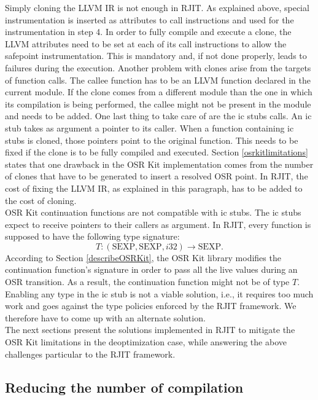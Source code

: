 Simply cloning the LLVM IR is not enough in RJIT.
As explained above, special instrumentation is inserted as attributes to call instructions and used for the instrumentation in step 4.
In order to fully compile and execute a clone, the LLVM attributes need to be set at each of its call instructions to allow the safepoint instrumentation.
This is mandatory and, if not done properly, leads to failures during the execution.
Another problem with clones arise from the targets of function calls. 
The callee function has to be an LLVM function declared in the current module. 
If the clone comes from a different module than the one in which its compilation is being performed, the callee might not be present in the module and needs to be added. 
One last thing to take care of are the ic stubs calls.
An ic stub takes as argument a pointer to its caller.
When a function containing ic stubs is cloned, those pointers point to the original function.
This needs to be fixed if the clone is to be fully compiled and executed.
Section \ref{osrkitlimitations} states that one drawback in the OSR Kit implementation comes from the number of clones that have to be generated to insert a resolved OSR point.
In RJIT, the cost of fixing the LLVM IR, as explained in this paragraph, has to be added to the cost of cloning.\\

OSR Kit continuation functions are not compatible with ic stubs.
The ic stubs expect to receive pointers to their callers as argument.
In RJIT, every function is supposed to have the following type signature:
$$T: (\text{SEXP}, \text{SEXP}, i32) \rightarrow \text{SEXP}.$$
According to Section \ref{describeOSRKit}, the OSR Kit\cite{OSRKit} library modifies the continuation function's signature in order to pass all the live values during an OSR transition.
As a result, the continuation function might not be of type $T$.
Enabling any type in the ic stub is not a viable solution, i.e., it requires too much work and goes against the type policies enforced by the RJIT framework. 
We therefore have to come up with an alternate solution.\\

The next sections present the solutions implemented in RJIT to mitigate the OSR Kit limitations in the deoptimization case, while answering the above challenges particular to the RJIT framework.\\

\subsection{Reducing the number of compilation}

